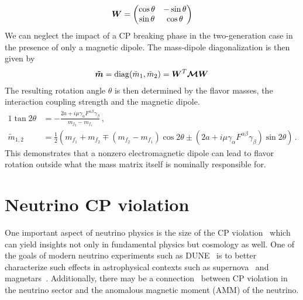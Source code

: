 \begin{alignat}{1}
	\label{mix:eq:04} \boldsymbol{W} = 
	\begin{pmatrix}
		\cos{\theta} & -\sin{\theta}\\
		\sin{\theta} & \cos{\theta}
	\end{pmatrix}
\end{alignat}
We can neglect the impact of a CP breaking phase in the two-generation case in the presence of only a magnetic dipole. The mass-dipole diagonalization is then given by
\begin{alignat}{1}
	\label{mix:eq:05} \boldsymbol{\tilde{m}} = \mathrm{diag}(\tilde{m}_{1},\tilde{m}_{2})=\boldsymbol{W}^{T}\boldsymbol{\mathcal{M}}\boldsymbol{W}
\end{alignat}
The resulting rotation angle $\theta$ is then determined by the flavor masses, the interaction coupling strength and the magnetic dipole. 
\begin{alignat}{1}
	\label{mix:eq:06a} \tan{2\theta}&=-\frac{2a+i\mu\gamma_{\alpha}F^{\alpha\beta}\gamma_{\beta}}{m_{f_{2}}-m_{f_{1}}}\,,\\
	\label{mix:eq:06b} \tilde{m}_{1,2}&=\frac{1}{2}\left(m_{f_{1}}+m_{f_{2}}\mp(m_{f_{2}}-m_{f_{1}})\cos{2\theta}\pm(2a+i\mu\gamma_{\alpha}F^{\alpha\beta}\gamma_{\beta})\sin{2\theta}\right)\,.
\end{alignat}
This demonstrates that a nonzero electromagnetic dipole can lead to flavor rotation outside what the mass matrix itself is nominally responsible for.

\section{Neutrino CP violation}
\label{sec:cpv}
\noindent One important aspect of neutrino physics is the size of the CP violation~\citep{wolfenstein1978oscillations,xing2001commutators,giunti2007fundamentals,huber2022snowmass} which can yield insights not only in fundamental physics but cosmology as well. One of the goals of modern neutrino experiments such as DUNE~\citep{abi2020long} is to better characterize such effects in astrophysical contexts such as supernova~\citep{abi2021supernova,abi2021prospects,athar2022status} and magnetars~\citep{lichkunov2019neutrino}. Additionally, there may be a connection~\citep{pehlivan2014neutrino,balaji2020cpa,balaji2020cpb} between CP violation in the neutrino sector and the anomalous magnetic moment (AMM) of the neutrino.


